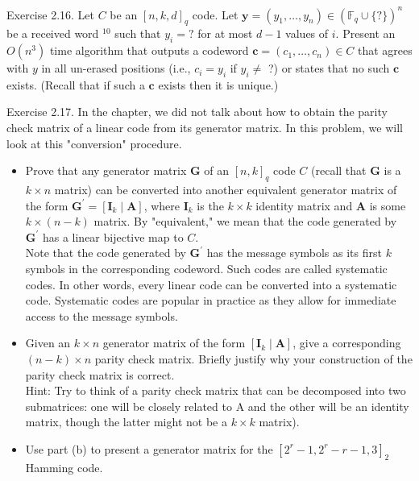 \documentclass[10pt]{article}
\begin{document}
Exercise 2.16. Let $C$ be an $[n, k, d]_{q}$ code. Let $\mathbf{y}=\left(y_{1}, \ldots, y_{n}\right) \in\left(\mathbb{F}_{q} \cup\{?\}\right)^{n}$ be a received word ${ }^{10}$ such that $y_{i}=?$ for at most $d-1$ values of $i$. Present an $O\left(n^{3}\right)$ time algorithm that outputs a codeword $\mathbf{c}=\left(c_{1}, \ldots, c_{n}\right) \in C$ that agrees with $y$ in all un-erased positions (i.e., $c_{i}=y_{i}$ if $y_{i} \neq$ ?) or states that no such $\mathbf{c}$ exists. (Recall that if such a $\mathbf{c}$ exists then it is unique.)

Exercise 2.17. In the chapter, we did not talk about how to obtain the parity check matrix of a linear code from its generator matrix. In this problem, we will look at this "conversion" procedure.

\begin{itemize}
  \item[(a)] Prove that any generator matrix $\mathbf{G}$ of an $[n, k]_{q}$ code $C$ (recall that $\mathbf{G}$ is a $k \times n$ matrix) can be converted into another equivalent generator matrix of the form $\mathbf{G}^{\prime}=\left[\mathbf{I}_{k} \mid \mathbf{A}\right]$, where $\mathbf{I}_{k}$ is the $k \times k$ identity matrix and $\mathbf{A}$ is some $k \times(n-k)$ matrix. By "equivalent," we mean that the code generated by $\mathbf{G}^{\prime}$ has a linear bijective map to $C$.\\
Note that the code generated by $\mathbf{G}^{\prime}$ has the message symbols as its first $k$ symbols in the corresponding codeword. Such codes are called systematic codes. In other words, every linear code can be converted into a systematic code. Systematic codes are popular in practice as they allow for immediate access to the message symbols.
  \item[(b)] Given an $k \times n$ generator matrix of the form $\left[\mathbf{I}_{k} \mid \mathbf{A}\right]$, give a corresponding $(n-k) \times n$ parity check matrix. Briefly justify why your construction of the parity check matrix is correct.\\
Hint: Try to think of a parity check matrix that can be decomposed into two submatrices: one will be closely related to A and the other will be an identity matrix, though the latter might not be a $k \times k$ matrix).
  \item[(c)] Use part (b) to present a generator matrix for the $\left[2^{r}-1,2^{r}-r-1,3\right]_{2}$ Hamming code.
\end{itemize}
\end{document}
